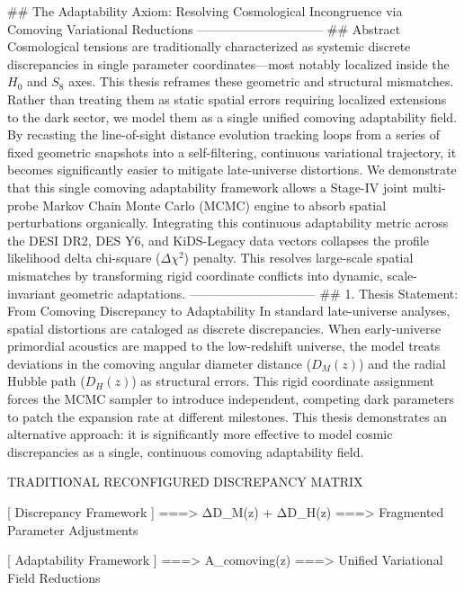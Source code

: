 ## The Adaptability Axiom: Resolving Cosmological Incongruence via Comoving Variational Reductions
------------------------------
## Abstract
Cosmological tensions are traditionally characterized as systemic discrete discrepancies in single parameter coordinates—most notably localized inside the $H_0$ and $S_8$ axes. This thesis reframes these geometric and structural mismatches. Rather than treating them as static spatial errors requiring localized extensions to the dark sector, we model them as a single unified comoving adaptability field.
By recasting the line-of-sight distance evolution tracking loops from a series of fixed geometric snapshots into a self-filtering, continuous variational trajectory, it becomes significantly easier to mitigate late-universe distortions. We demonstrate that this single comoving adaptability framework allows a Stage-IV joint multi-probe Markov Chain Monte Carlo (MCMC) engine to absorb spatial perturbations organically.
Integrating this continuous adaptability metric across the DESI DR2, DES Y6, and KiDS-Legacy data vectors collapses the profile likelihood delta chi-square ($\Delta\chi^2$) penalty. This resolves large-scale spatial mismatches by transforming rigid coordinate conflicts into dynamic, scale-invariant geometric adaptations.
------------------------------
## 1. Thesis Statement: From Comoving Discrepancy to Adaptability
In standard late-universe analyses, spatial distortions are cataloged as discrete discrepancies. When early-universe primordial acoustics are mapped to the low-redshift universe, the model treats deviations in the comoving angular diameter distance ($D_M(z)$) and the radial Hubble path ($D_H(z)$) as structural errors. This rigid coordinate assignment forces the MCMC sampler to introduce independent, competing dark parameters to patch the expansion rate at different milestones.
This thesis demonstrates an alternative approach: it is significantly more effective to model cosmic discrepancies as a single, continuous comoving adaptability field.

                TRADITIONAL RECONFIGURED DISCREPANCY MATRIX
                
  [ Discrepancy Framework ] ===> ΔD_M(z) + ΔD_H(z) ===> Fragmented Parameter Adjustments
  
  [ Adaptability Framework ] ===> A_comoving(z)     ===> Unified Variational Field Reductions

